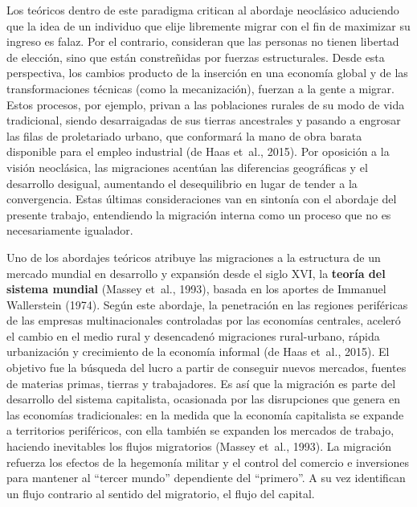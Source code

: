 \documentclass[12pt,spanish,]{article}
\begin{document}
Los teóricos dentro de este paradigma critican al abordaje neoclásico
aduciendo que la idea de un individuo que elije libremente migrar con el
fin de maximizar su ingreso es falaz. Por el contrario, consideran que
las personas no tienen libertad de elección, sino que están constreñidas
por fuerzas estructurales. Desde esta perspectiva, los cambios producto
de la inserción en una economía global y de las transformaciones
técnicas (como la mecanización), fuerzan a la gente a migrar. Estos
procesos, por ejemplo, privan a las poblaciones rurales de su modo de
vida tradicional, siendo desarraigadas de sus tierras ancestrales y
pasando a engrosar las filas de proletariado urbano, que conformará la
mano de obra barata disponible para el empleo industrial (de Haas
et~al., 2015). Por oposición a la visión neoclásica, las migraciones
acentúan las diferencias geográficas y el desarrollo desigual,
aumentando el desequilibrio en lugar de tender a la convergencia. Estas
últimas consideraciones van en sintonía con el abordaje del presente
trabajo, entendiendo la migración interna como un proceso que no es
necesariamente igualador.

Uno de los abordajes teóricos atribuye las migraciones a la estructura
de un mercado mundial en desarrollo y expansión desde el siglo XVI, la
\textbf{teoría del sistema mundial} (Massey et~al., 1993), basada en los
aportes de Immanuel Wallerstein (1974). Según este abordaje, la
penetración en las regiones periféricas de las empresas multinacionales
controladas por las economías centrales, aceleró el cambio en el medio
rural y desencadenó migraciones rural-urbano, rápida urbanización y
crecimiento de la economía informal (de Haas et~al., 2015). El objetivo
fue la búsqueda del lucro a partir de conseguir nuevos mercados, fuentes
de materias primas, tierras y trabajadores. Es así que la migración es
parte del desarrollo del sistema capitalista, ocasionada por las
disrupciones que genera en las economías tradicionales: en la medida que
la economía capitalista se expande a territorios periféricos, con ella
también se expanden los mercados de trabajo, haciendo inevitables los
flujos migratorios (Massey et~al., 1993). La migración refuerza los
efectos de la hegemonía militar y el control del comercio e inversiones
para mantener al ``tercer mundo'' dependiente del ``primero''. A su vez
identifican un flujo contrario al sentido del migratorio, el flujo del
capital.
\end{document}

